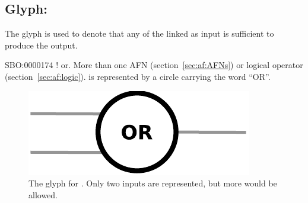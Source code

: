\subsection{Glyph: }
\label{sec:af:or}

The glyph  is used to denote that any of the  linked as input is sufficient to produce the output.

\begin{glyphDescription}
 \glyphSboTerm SBO:0000174 ! or.
 \glyphOrigin More than one AFN (section~\ref{sec:af:AFNs}) or logical operator (section~\ref{sec:af:logic}).
 \glyphTarget  
 \glyphNode {} is represented by a circle carrying the word ``OR''.
 \end{glyphDescription}

\begin{figure}[H]
  \centering
  \includegraphics[scale = 0.5]{images/or}
  \caption{The \AF glyph for . Only two inputs are represented, but more would be allowed.}
  \label{fig:af:or}
\end{figure}
